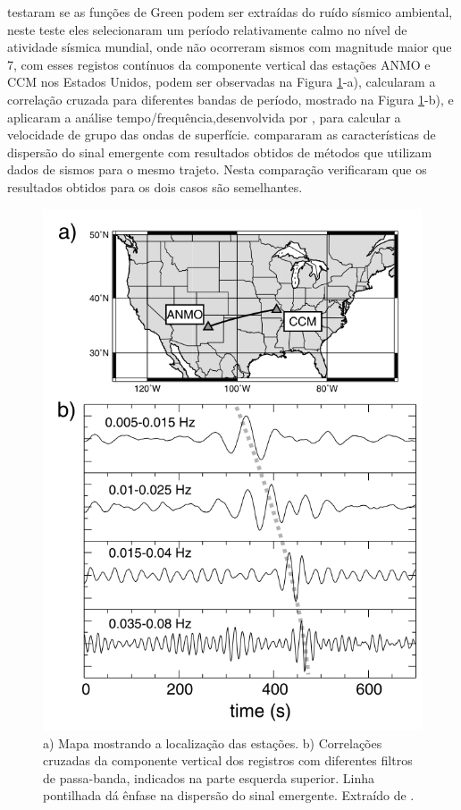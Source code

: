 \cite{shapiro_emergence_2004} testaram se as funções de Green podem ser extraídas do ruído sísmico ambiental, neste teste eles selecionaram um
período relativamente calmo no nível de atividade sísmica mundial, onde não ocorreram sismos com magnitude maior que 7, com esses registos contínuos da componente vertical das estações ANMO e CCM nos Estados Unidos, podem ser observadas na Figura \ref{shapiro}-a), calcularam a correlação cruzada para diferentes bandas de período, mostrado na Figura \ref{shapiro}-b), e aplicaram a análise tempo/frequência,desenvolvida por \cite{levshin_automated_2001}, para calcular a velocidade de grupo das ondas de superfície. \cite{shapiro_emergence_2004} compararam as características de dispersão do sinal emergente com resultados obtidos de métodos que utilizam dados de sismos para o mesmo trajeto.  Nesta comparação verificaram que os resultados obtidos para os dois casos são semelhantes.

\begin{figure}[!ht]
\centering
\includegraphics[scale=0.5]{Figs/shapiro2004.png}
\caption{a) Mapa mostrando a localização das estações. b) Correlações cruzadas da componente vertical dos registros com diferentes filtros de passa-banda, indicados na parte esquerda superior. Linha pontilhada dá ênfase na dispersão do sinal emergente. Extraído de \cite{shapiro_emergence_2004}.}
\label{shapiro}
\end{figure} 

